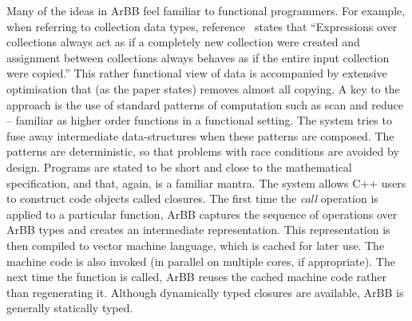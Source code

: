 Many of the ideas in ArBB feel familiar to functional programmers.
For example, when referring to collection data types, reference~ states that ``Expressions over collections always act as if a completely new collection were created and assignment between collections always behaves as if the entire input collection were copied.''
This rather functional view of data is accompanied by extensive optimisation that (as the paper states) removes almost all copying.
A key to the approach is the use of standard patterns of computation such as scan and reduce -- familiar as higher order functions in a functional setting.
The system tries to fuse away intermediate data-structures
when these patterns are composed.
The patterns are deterministic, so that problems with race conditions are avoided by design. Programs are stated to be short and close to the mathematical specification, and that, again, is a familiar mantra. The system allows C++ users to construct code objects called closures.
The first time the {\em call} operation is applied to
a particular function, ArBB captures the sequence of operations
over ArBB types and creates an intermediate representation. 
This representation is then compiled to
vector machine language, which is
cached for later use.  The
machine code is also invoked (in parallel on multiple
cores, if appropriate). The next time the function
is called, ArBB reuses the cached machine
code rather than regenerating it.
Although dynamically typed closures are available, ArBB is generally
statically typed.






